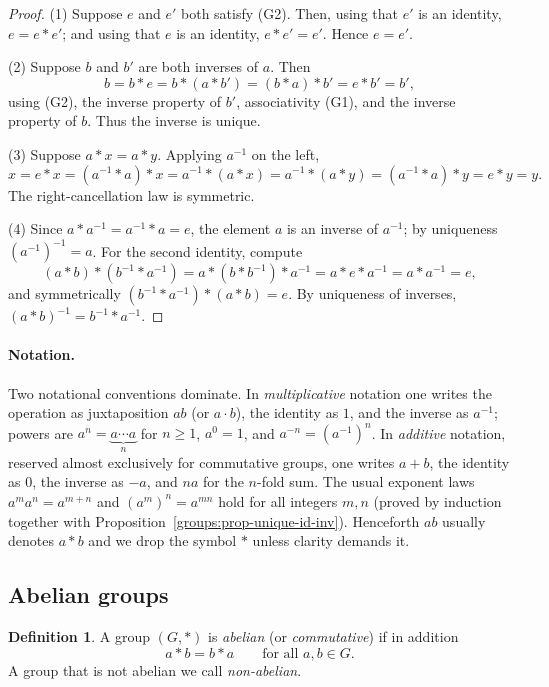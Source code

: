 \documentclass[11pt,a4paper]{article}
\theoremstyle{definition}
\newtheorem{definition}[theorem]{Definition}
\theoremstyle{remark}
\begin{document}
\begin{proof}
(1) Suppose \(e\) and \(e'\) both satisfy (G2). Then, using that \(e'\) is an identity, \(e = e \ast e'\); and using that \(e\) is an identity, \(e \ast e' = e'\). Hence \(e = e'\).

(2) Suppose \(b\) and \(b'\) are both inverses of \(a\). Then
\[
b = b \ast e = b \ast (a \ast b') = (b \ast a) \ast b' = e \ast b' = b',
\]
using (G2), the inverse property of \(b'\), associativity (G1), and the inverse property of \(b\). Thus the inverse is unique.

(3) Suppose \(a \ast x = a \ast y\). Applying \(a^{-1}\) on the left,
\[
x = e \ast x = (a^{-1} \ast a) \ast x = a^{-1} \ast (a \ast x) = a^{-1} \ast (a \ast y) = (a^{-1} \ast a) \ast y = e \ast y = y.
\]
The right-cancellation law is symmetric.

(4) Since \(a \ast a^{-1} = a^{-1} \ast a = e\), the element \(a\) is an inverse of \(a^{-1}\); by uniqueness \((a^{-1})^{-1} = a\). For the second identity, compute
\[
(a \ast b) \ast (b^{-1} \ast a^{-1}) = a \ast (b \ast b^{-1}) \ast a^{-1} = a \ast e \ast a^{-1} = a \ast a^{-1} = e,
\]
and symmetrically \((b^{-1} \ast a^{-1}) \ast (a \ast b) = e\). By uniqueness of inverses, \((a\ast b)^{-1} = b^{-1} \ast a^{-1}\).
\end{proof}

\paragraph{Notation.} Two notational conventions dominate. In \emph{multiplicative} notation one writes the operation as juxtaposition \(ab\) (or \(a \cdot b\)), the identity as \(1\), and the inverse as \(a^{-1}\); powers are \(a^n = \underbrace{a \cdots a}_{n}\) for \(n \ge 1\), \(a^0 = 1\), and \(a^{-n} = (a^{-1})^n\). In \emph{additive} notation, reserved almost exclusively for commutative groups, one writes \(a + b\), the identity as \(0\), the inverse as \(-a\), and \(na\) for the \(n\)-fold sum. The usual exponent laws \(a^m a^n = a^{m+n}\) and \((a^m)^n = a^{mn}\) hold for all integers \(m,n\) (proved by induction together with Proposition~\ref{groups:prop-unique-id-inv}). Henceforth \(ab\) usually denotes \(a \ast b\) and we drop the symbol \(\ast\) unless clarity demands it.
\subsection{Abelian groups}

\begin{definition}\label{groups:def-abelian}
A group \((G,\ast)\) is \emph{abelian} (or \emph{commutative}) if in addition
\[
a \ast b = b \ast a \qquad \text{for all } a,b \in G.
\]
A group that is not abelian we call \emph{non-abelian}.
\end{definition}
\end{document}
